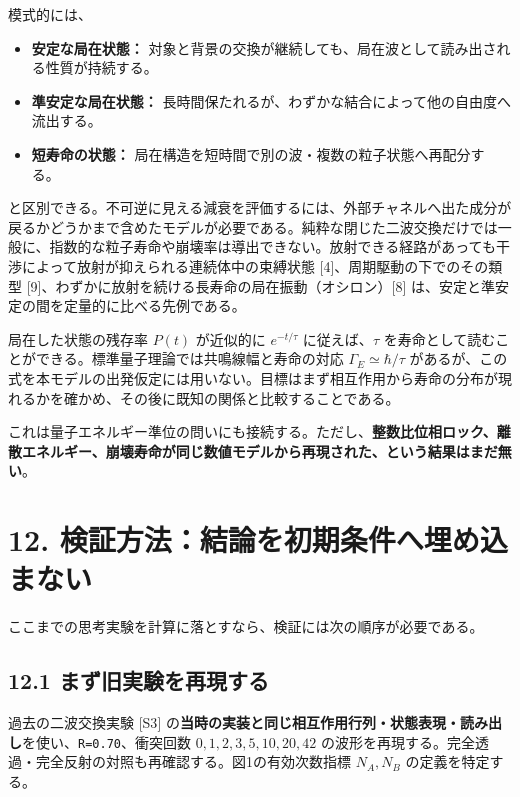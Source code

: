 \documentclass[
  a4paper,
]{ltjsarticle}
\providecommand{\tightlist}{%
  \setlength{\itemsep}{0pt}\setlength{\parskip}{0pt}}
\begin{document}
模式的には、

\begin{itemize}
\tightlist
\item
  \textbf{安定な局在状態：}
  対象と背景の交換が継続しても、局在波として読み出される性質が持続する。
\item
  \textbf{準安定な局在状態：}
  長時間保たれるが、わずかな結合によって他の自由度へ流出する。
\item
  \textbf{短寿命の状態：}
  局在構造を短時間で別の波・複数の粒子状態へ再配分する。
\end{itemize}

と区別できる。不可逆に見える減衰を評価するには、外部チャネルへ出た成分が戻るかどうかまで含めたモデルが必要である。純粋な閉じた二波交換だけでは一般に、指数的な粒子寿命や崩壊率は導出できない。放射できる経路があっても干渉によって放射が抑えられる連続体中の束縛状態
{[}4{]}、周期駆動の下でのその類型
{[}9{]}、わずかに放射を続ける長寿命の局在振動（オシロン）{[}8{]}
は、安定と準安定の間を定量的に比べる先例である。

局在した状態の残存率 \(P(t)\) が近似的に \(e^{-t/\tau}\)
に従えば、\(\tau\)
を寿命として読むことができる。標準量子理論では共鳴線幅と寿命の対応
\(\Gamma_E\simeq\hbar/\tau\)
があるが、この式を本モデルの出発仮定には用いない。目標はまず相互作用から寿命の分布が現れるかを確かめ、その後に既知の関係と比較することである。

これは量子エネルギー準位の問いにも接続する。ただし、\textbf{整数比位相ロック、離散エネルギー、崩壊寿命が同じ数値モデルから再現された、という結果はまだ無い}。

\section{12.
検証方法：結論を初期条件へ埋め込まない}\label{ux691cux8a3cux65b9ux6cd5ux7d50ux8ad6ux3092ux521dux671fux6761ux4ef6ux3078ux57cbux3081ux8fbcux307eux306aux3044}

ここまでの思考実験を計算に落とすなら、検証には次の順序が必要である。

\subsection{12.1
まず旧実験を再現する}\label{ux307eux305aux65e7ux5b9fux9a13ux3092ux518dux73feux3059ux308b}

過去の二波交換実験 {[}S3{]}
の\textbf{当時の実装と同じ相互作用行列・状態表現・読み出し}を使い、\texttt{R=0.70}、衝突回数
\(0,1,2,3,5,10,20,42\)
の波形を再現する。完全透過・完全反射の対照も再確認する。図1の有効次数指標
\(N_A,N_B\) の定義を特定する。
\end{document}
